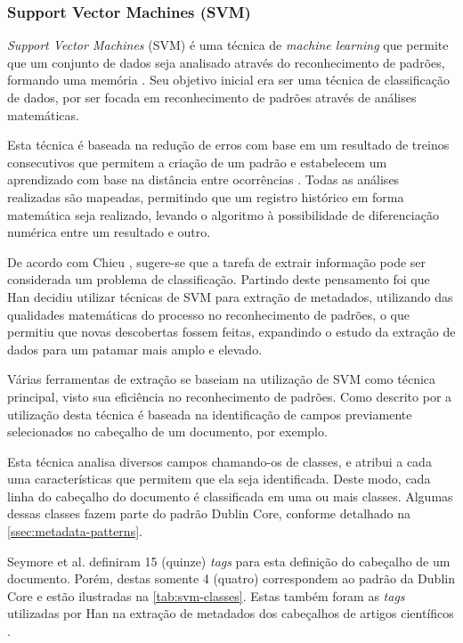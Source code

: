 
\subsubsection{Support Vector Machines (SVM)}
\label{sssec:svm}

\emph{Support Vector Machines} (SVM) é uma técnica de \textit{machine learning} que permite que um conjunto de dados seja analisado através do reconhecimento de padrões, formando uma memória \cite{Vapnik-SVM}. Seu objetivo inicial era ser uma técnica de classificação de dados, por ser focada em reconhecimento de padrões através de análises matemáticas.

Esta técnica é baseada na redução de erros com base em um resultado de treinos consecutivos que permitem a criação de um padrão e estabelecem um aprendizado com base na distância entre ocorrências \cite{Vapnik-SVM}. Todas as análises realizadas são mapeadas, permitindo que um registro histórico em forma matemática seja realizado, levando o algoritmo à possibilidade de diferenciação numérica entre um resultado e outro.

De acordo com Chieu \cite{Chieu}, sugere-se que a tarefa de extrair informação pode ser considerada um problema de classificação. Partindo deste pensamento foi que Han \cite{Han-SVM} decidiu utilizar técnicas de SVM para extração de metadados, utilizando das qualidades matemáticas do processo no reconhecimento de padrões, o que permitiu que novas descobertas fossem feitas, expandindo o estudo da extração de dados para um patamar mais amplo e elevado.

Várias ferramentas de extração se baseiam na utilização de SVM como técnica principal, visto sua eficiência no reconhecimento de padrões. Como descrito por \cite{Han-SVM} a utilização desta técnica é baseada na identificação de campos previamente selecionados no cabeçalho de um documento, por exemplo.

Esta técnica analisa diversos campos chamando-os de classes, e atribui a cada uma características que permitem que ela seja identificada. Deste modo, cada linha do cabeçalho do documento é classificada em uma ou mais classes. Algumas dessas classes fazem parte do padrão Dublin Core, conforme detalhado na \autoref{ssec:metadata-patterns}.

Seymore et al. \cite{Seymore-HMM-IE} definiram 15 (quinze) \textit{tags} para esta definição do cabeçalho de um documento. Porém, destas somente 4 (quatro) correspondem ao padrão da Dublin Core e estão ilustradas na \autoref{tab:svm-classes}. Estas também foram as \textit{tags} utilizadas por Han na extração de metadados dos cabeçalhos de artigos científicos \cite{Han-SVM}.


